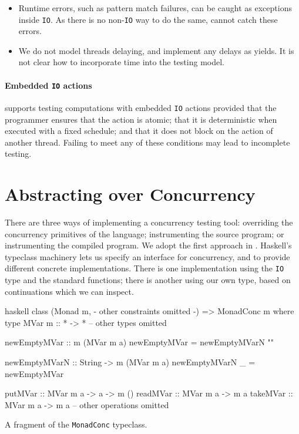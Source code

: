 \begin{itemize}
\item Runtime errors, such as pattern match failures, can be caught as
  exceptions inside \verb|IO|.  As there is no non-\verb|IO| way to do
  the same, \dejafu{} cannot catch these errors.

\item We do not model threads delaying, and implement any delays as
  yields.  It is not clear how to incorporate time into the testing
  model.
\end{itemize}

\paragraph{Embedded \texttt{IO} actions}
\dejafu{} supports testing computations with embedded \verb|IO|
actions provided that the programmer ensures that the action is
atomic; that it is deterministic when executed with a fixed schedule;
and that it does not block on the action of another thread.  Failing
to meet any of these conditions may lead to incomplete testing.

\section{Abstracting over Concurrency}
\label{sec:dejafu-monadconc}

There are three ways of implementing a concurrency testing tool:
overriding the concurrency primitives of the language; instrumenting
the source program; or instrumenting the compiled program.  We adopt
the first approach in \dejafu{}.  Haskell's typeclass machinery lets
us specify an interface for concurrency, and to provide different
concrete implementations.  There is one implementation using the
\verb|IO| type and the standard functions; there is another using our
own type, based on continuations which we can inspect.

\begin{listing}
\centering
\begin{cminted}{haskell}
class (Monad m, {- other constraints omitted -}) => MonadConc m where
  type MVar m :: * -> *
  -- other types omitted

  newEmptyMVar :: m (MVar m a)
  newEmptyMVar = newEmptyMVarN ""

  newEmptyMVarN :: String -> m (MVar m a)
  newEmptyMVarN _ = newEmptyMVar

  putMVar  :: MVar m a -> a -> m ()
  readMVar :: MVar m a -> m a
  takeMVar :: MVar m a -> m a
  -- other operations omitted
\end{cminted}
\caption{A fragment of the \texttt{MonadConc} typeclass.}\label{lst:monadconc}
\end{listing}

